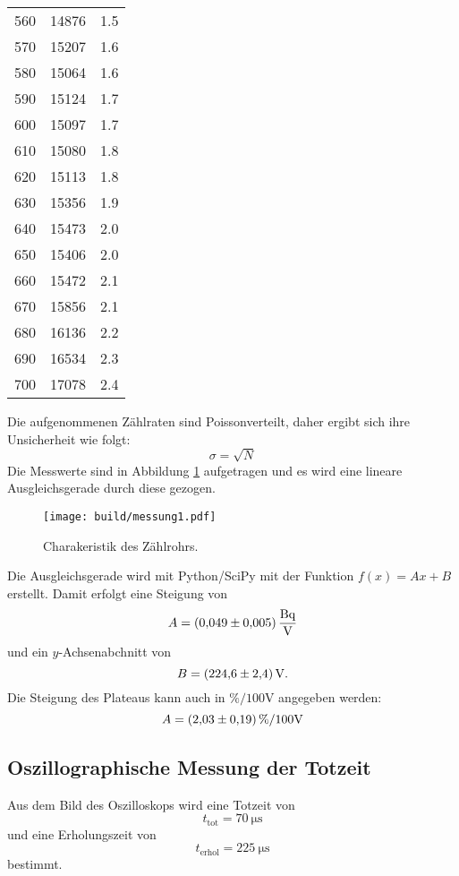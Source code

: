 \begin{table}
\begin{tabular}{S[table-format=3.0] S[table-format=5.0] S[table-format=1.2(0)e0]}
        560 & 14876 & 1.5 \\
        570 & 15207 & 1.6 \\
        580 & 15064 & 1.6 \\
        590 & 15124 & 1.7 \\
        600 & 15097 & 1.7 \\
        610 & 15080 & 1.8 \\
        620 & 15113 & 1.8 \\
        630 & 15356 & 1.9 \\
        640 & 15473 & 2.0 \\
        650 & 15406 & 2.0 \\
        660 & 15472 & 2.1 \\
        670 & 15856 & 2.1 \\
        680 & 16136 & 2.2 \\
        690 & 16534 & 2.3 \\
        700 & 17078 & 2.4 \\
        \bottomrule
    \end{tabular}
\end{table}
\noindent Die aufgenommenen Zählraten sind Poissonverteilt, daher ergibt sich ihre Unsicherheit wie folgt:
\begin{equation}
  \sigma = \sqrt{N}
\end{equation}
Die Messwerte sind in Abbildung \ref{fig:plot} aufgetragen und es wird eine lineare Ausgleichsgerade durch diese gezogen.
\begin{figure}[H]
  \centering
  \texttt{[image: build/messung1.pdf]}
  \caption{Charakeristik des Zählrohrs.}
  \label{fig:plot}
\end{figure}
\noindent  Die Ausgleichsgerade wird mit Python/SciPy mit der Funktion $f(x)= Ax + B$ erstellt.
Damit erfolgt eine Steigung von
\begin{equation}
  A = \SI{0.049 \pm 0.005}{\becquerel\per\volt}
\end{equation}
und ein $y$-Achsenabchnitt von
\begin{equation}
  B =   \SI[per-mode=reciprocal]{224.6\pm 2.4}{\volt}        .
\end{equation}
Die Steigung des Plateaus kann auch in $\si{\percent\per\num{100}\volt}$ angegeben werden:
\begin{equation}
	A = \SI{2.03\pm0.19}{\percent\per{100\volt}}
\end{equation}
\subsection{Oszillographische Messung der Totzeit}
Aus dem Bild des Oszilloskops wird eine Totzeit von
\begin{equation*}
  t_\text{tot} = \SI{70}{\micro \second}
\end{equation*}
und eine Erholungszeit von
\begin{equation*}
    t_\text{erhol} = \SI{225}{\micro\second}
\end{equation*}
bestimmt.
